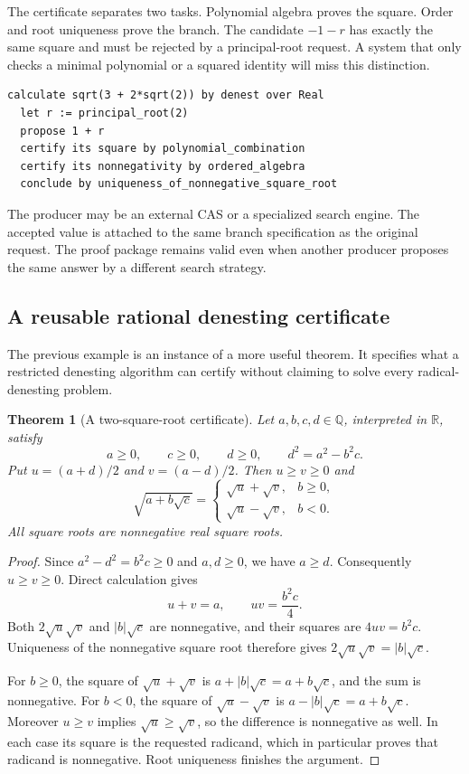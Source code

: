 \documentclass[11pt,a4paper]{article}
\newcommand{\Q}{\mathbb{Q}}
\newcommand{\R}{\mathbb{R}}
\newtheorem{theorem}[proposition]{Theorem}
\theoremstyle{definition}
\begin{document}
The certificate separates two tasks. Polynomial algebra proves the square.
Order and root uniqueness prove the branch. The candidate $-1-r$ has exactly
the same square and must be rejected by a principal-root request. A system that
only checks a minimal polynomial or a squared identity will miss this distinction.

\par\noindent\begin{minipage}{\linewidth}
\begin{lstlisting}
calculate sqrt(3 + 2*sqrt(2)) by denest over Real
  let r := principal_root(2)
  propose 1 + r
  certify its square by polynomial_combination
  certify its nonnegativity by ordered_algebra
  conclude by uniqueness_of_nonnegative_square_root
\end{lstlisting}
\end{minipage}\par
The producer may be an external CAS or a specialized search engine. The accepted
value is attached to the same branch specification as the original request.
The proof package remains valid even when another producer proposes the same
answer by a different search strategy.

\subsection{A reusable rational denesting certificate}
The previous example is an instance of a more useful theorem. It specifies
what a restricted denesting algorithm can certify without claiming to solve
every radical-denesting problem.

\begin{theorem}[A two-square-root certificate]
Let $a,b,c,d\in\Q$, interpreted in $\R$, satisfy
\[
 a\ge0,\qquad c\ge0,\qquad d\ge0,\qquad d^2=a^2-b^2c.
\]
Put $u=(a+d)/2$ and $v=(a-d)/2$. Then $u\ge v\ge0$ and
\[
 \sqrt{a+b\sqrt c}
 =\begin{cases}
   \sqrt u+\sqrt v,& b\ge0,\\
   \sqrt u-\sqrt v,& b<0.
  \end{cases}
\]
All square roots are nonnegative real square roots.
\end{theorem}
\begin{proof}
Since $a^2-d^2=b^2c\ge0$ and $a,d\ge0$, we have $a\ge d$.
Consequently $u\ge v\ge0$. Direct calculation gives
\[
 u+v=a,\qquad uv=\frac{b^2c}{4}.
\]
Both $2\sqrt u\sqrt v$ and $|b|\sqrt c$ are nonnegative, and their squares
are $4uv=b^2c$. Uniqueness of the nonnegative square root therefore gives
$2\sqrt u\sqrt v=|b|\sqrt c$.

For $b\ge0$, the square of $\sqrt u+\sqrt v$ is
$a+|b|\sqrt c=a+b\sqrt c$, and the sum is nonnegative.
For $b<0$, the square of $\sqrt u-\sqrt v$ is
$a-|b|\sqrt c=a+b\sqrt c$. Moreover $u\ge v$ implies
$\sqrt u\ge\sqrt v$, so the difference is nonnegative as well.
In each case its square is the requested radicand, which in particular proves
that radicand is nonnegative. Root uniqueness finishes the argument.
\end{proof}
\end{document}

